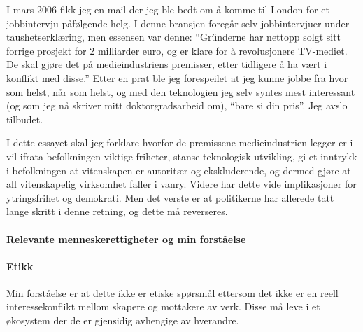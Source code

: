 
I mars 2006 fikk jeg en mail der jeg ble bedt om å komme til London
for et jobbintervju påfølgende helg. I denne bransjen foregår selv
jobbintervjuer under taushetserklæring, men essensen var denne:
``Gründerne har nettopp solgt sitt forrige prosjekt for 2 milliarder
euro, og er klare for å revolusjonere TV-mediet. De skal gjøre det på
medieindustriens premisser, etter tidligere å ha vært i konflikt med
disse.'' Etter en prat ble jeg forespeilet at jeg kunne jobbe fra hvor
som helst, når som helst, og med den teknologien jeg selv syntes mest
interessant (og som jeg nå skriver mitt doktorgradsarbeid om), ``bare
si din pris''. Jeg avslo tilbudet.

I dette essayet skal jeg forklare hvorfor de premissene
medieindustrien legger er i vil ifrata befolkningen viktige friheter,
stanse teknologisk utvikling, gi et inntrykk i befolkningen at
vitenskapen er autoritær og ekskluderende, og dermed gjøre at all
vitenskapelig virksomhet faller i vanry. Videre har dette vide
implikasjoner for ytringsfrihet og demokrati. Men det verste er at
politikerne har allerede tatt lange skritt i denne retning, og dette
må reverseres.


\paragraph{Relevante menneskerettigheter og min forståelse}


\paragraph{Etikk}

Min forståelse er at dette ikke er etiske spørsmål ettersom det ikke
er en reell interessekonflikt mellom skapere og mottakere av
verk. Disse må leve i et økosystem der de er gjensidig avhengige av
hverandre. 
